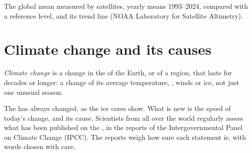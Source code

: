 \begin{omfigure}

{\small The global mean  measured by satellites, yearly means
1993--2024, compared with a reference level, and its trend line (NOAA
Laboratory for Satellite Altimetry).}
\label{fig:g9:climate-past-and-present:sea}
\end{omfigure}

\section{Climate change and its causes}

\begin{definition}\label{def:g9:climate-past-and-present:climate-change}
\emph{Climate change} is a change in the 
of the Earth, or of a region, that lasts for decades or longer: a change
of its average temperature, , winds or ice, not just one unusual
season.
\end{definition}

The  has always changed, as the ice cores show. What is new is
the speed of today's change, and its cause. Scientists from all over the
world regularly assess what has been published on the , in the
reports of the Intergovernmental Panel on Climate Change (IPCC). The
reports weigh how sure each statement is, with words chosen with care.

